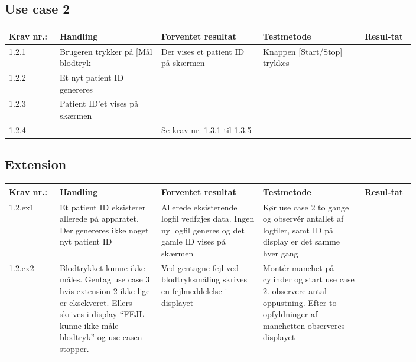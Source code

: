 \documentclass[12pt, a4paper]{memoir}
\begin{document}
\begin{landscape}
	\subsection{Use case 2}
		\begin{longtable}{|p{0.1\linewidth}|p{0.2\linewidth}|p{0.2\linewidth}|p{0.2\linewidth}|p{0.1\linewidth}|}
			\hline
			Krav nr.: & Handling & Forventet resultat & Testmetode & Resul-tat  \\\hline
			1.2.1 & Brugeren trykker på [Mål blodtryk] & \multirow{3}{\linewidth}{Der vises et patient ID på skærmen} & \multirow{3}{\linewidth}{Knappen [Start/Stop] trykkes} & \multirow{3}{\linewidth}{}  \\ \cline{1-2} 
			1.2.2 & Et nyt patient ID genereres & & &  \\ \cline{1-2}
			1.2.3 & Patient ID’et vises på skærmen & & &  \\ \hline
			1.2.4 & & \multicolumn{3}{l|}{Se krav nr. 1.3.1 til 1.3.5} \\ 
			\hline
			
		\end{longtable}
	
	\subsection*{Extension}
		\begin{longtable}{|p{0.1\linewidth}|p{0.2\linewidth}|p{0.2\linewidth}|p{0.2\linewidth}|p{0.1\linewidth}|}
			\hline
			Krav nr.: & Handling & Forventet resultat & Testmetode & Resul-tat  \\\hline
			1.2.ex1 & Et patient ID eksisterer allerede på apparatet. Der genereres ikke noget nyt patient ID & Allerede eksisterende logfil vedføjes data. Ingen ny logfil generes og det gamle ID vises på skærmen & Kør use case 2 to gange og observér antallet af logfiler, samt ID på display er det samme hver gang &  \\ \hline
			1.2.ex2 & Blodtrykket kunne ikke måles. Gentag use case 3 hvis extension 2 ikke lige er eksekveret. Ellers skrives i display “FEJL kunne ikke måle blodtryk” og use casen stopper.  & Ved gentagne fejl ved blodtryksmåling skrives en fejlmeddelelse i displayet & Montér manchet på cylinder og start use case 2. observere antal oppustning. Efter to opfyldninger af manchetten observeres displayet & \\ \hline
		\end{longtable}
	
	\pagebreak

\end{landscape}
\end{document}
